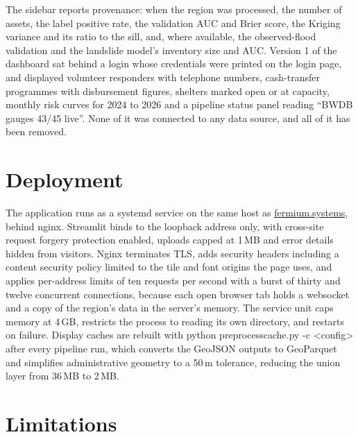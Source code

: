 \documentclass[10pt,a4paper,twocolumn]{article}
\makeatletter
\let\orig@texttt\texttt
\renewcommand{\texttt}[1]{%
  \ifmmode\text{\orig@texttt{#1}}\else
  \begingroup\ttfamily\def\_{\textunderscore\allowbreak}#1\endgroup\fi}
\makeatother
\begin{document}
The sidebar reports provenance: when the region was processed, the number of assets, the label positive rate, the validation AUC and Brier score, the Kriging variance and its ratio to the sill, and, where available, the observed-flood validation and the landslide model's inventory size and AUC. Version 1 of the dashboard sat behind a login whose credentials were printed on the login page, and displayed volunteer responders with telephone numbers, cash-transfer programmes with disbursement figures, shelters marked open or at capacity, monthly risk curves for 2024 to 2026 and a pipeline status panel reading ``BWDB gauges 43/45 live''. None of it was connected to any data source, and all of it has been removed.

\section{Deployment}

The application runs as a systemd service on the same host as \url{fermium.systems}, behind nginx. Streamlit binds to the loopback address only, with cross-site request forgery protection enabled, uploads capped at 1\,MB and error details hidden from visitors. Nginx terminates TLS, adds security headers including a content security policy limited to the tile and font origins the page uses, and applies per-address limits of ten requests per second with a burst of thirty and twelve concurrent connections, because each open browser tab holds a websocket and a copy of the region's data in the server's memory. The service unit caps memory at 4\,GB, restricts the process to reading its own directory, and restarts on failure. Display caches are rebuilt with \texttt{python preprocess\_cache.py -c <config>} after every pipeline run, which converts the GeoJSON outputs to GeoParquet and simplifies administrative geometry to a 50\,m tolerance, reducing the union layer from 36\,MB to 2\,MB.

\section{Limitations}
\label{sec:limitations}
\end{document}
